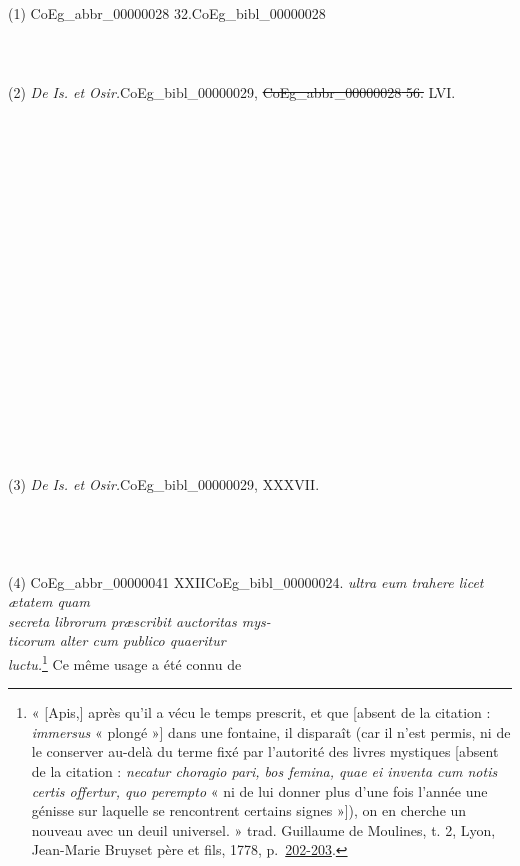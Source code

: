 \documentclass{book}
\begin{document}
{\begin{paracol}{2}
\noindent \\
\\
\\
\\
(1) \gls{CoEg_abbr_00000028} 32.\gls{CoEg_bibl_00000028}\\
\\
\\
\\
(2) \textit{De Is. et Osir.}\gls{CoEg_bibl_00000029}, \sout{\gls{CoEg_abbr_00000028} 56.} LVI.\\
\\
\\
\\
\\
\\
\\
\\
\\
\\
\\
\\
\\
\\
\\
\\
\\
\\
\\
\\
(3) \textit{De Is. et Osir.}\gls{CoEg_bibl_00000029}, XXXVII.\\
\\
\\
\\
\\
(4) \Gls{CoEg_abbr_00000041} XXII\gls{CoEg_bibl_00000024}.
\switchcolumn
\noindent \textit{ultra eum trahere licet ætatem quam\\
secreta librorum præscribit auctoritas mys-\\
ticorum alter cum publico quaeritur\\
luctu.}\footnote{« [Apis,] après qu’il a vécu le temps prescrit, et que [absent de la citation : \textit{immersus} « plongé »] dans une fontaine, il disparaît (car il n’est permis, ni de le conserver au-delà du terme fixé par l’autorité des livres mystiques [absent de la citation : \textit{necatur choragio pari, bos femina, quae ei inventa cum notis certis offertur, quo perempto} « ni de lui donner plus d’une fois l’année une génisse sur laquelle se rencontrent certains signes »]), on en cherche un nouveau avec un deuil universel. » trad. Guillaume de Moulines, t. 2, Lyon, Jean-Marie Bruyset père et fils, 1778, p.~\href{https://gallica.bnf.fr/ark:/12148/bpt6k6472037r/f225.item}{202-203}.} Ce même usage a été connu de\\

\end{paracol}}
\end{document}
